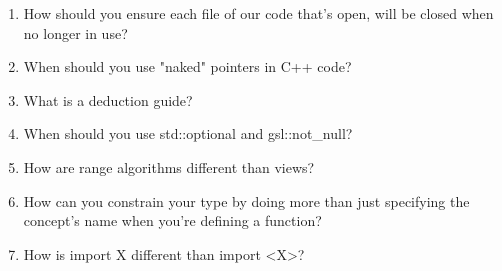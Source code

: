 \begin{enumerate}
\item
How should you ensure each file of our code that's open, will be closed when no longer in use?
\item When should you use "naked" pointers in C++ code?
\item What is a deduction guide?
\item When should you use std::optional and gsl::not\_null?
\item How are range algorithms different than views?
\item How can you constrain your type by doing more than just specifying the concept's name when you're defining a function?
\item How is import X different than import <X>?
\end{enumerate}